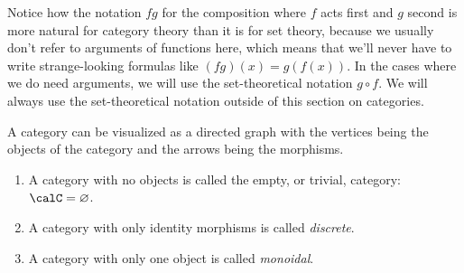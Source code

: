 Notice how the notation $fg$ for the composition where $f$ acts first and $g$ second is more natural for category theory than it is for set theory, because we usually don't refer to arguments of functions here, which means that we'll never have to write strange-looking formulas like $(fg)(x)=g(f(x))$. In the cases where we do need arguments, we will use the set-theoretical notation $g\circ f$. We will always use the set-theoretical notation outside of this section on categories.

A category can be visualized as a directed graph with the vertices
being the objects of the category and the arrows being the morphisms.
\begin{example}
\begin{enumerate}
    \item A category with no objects is called the empty, or trivial, category: $\calC=\varnothing$.
    \item A category with only identity morphisms is called \emph{discrete}.
    \item A category with only one object is called \emph{monoidal}.
\end{enumerate}
    
\end{example}

